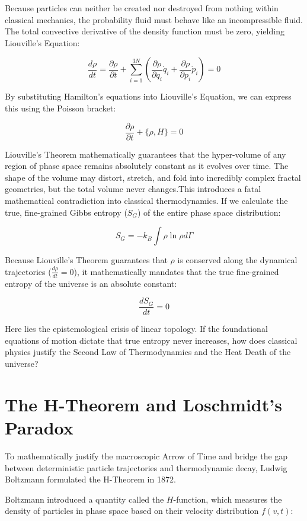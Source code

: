\documentclass[12pt,openany]{book}
\theoremstyle{plain}
\theoremstyle{definition}
\theoremstyle{remark}
\begin{document}
Because particles can neither be created nor destroyed from nothing within classical mechanics, the probability fluid must behave like an incompressible fluid. The total convective derivative of the density function must be zero, yielding Liouville's Equation:

$$\frac{d\rho}{dt}=\frac{\partial\rho}{\partial t}+\sum_{i=1}^{3N}\left(\frac{\partial\rho}{\partial q_i}\dot{q}_i+\frac{\partial\rho}{\partial p_i}\dot{p}_i\right)=0$$

By substituting Hamilton's equations into Liouville's Equation, we can express this using the Poisson bracket:

$$\frac{\partial\rho}{\partial t}+\{\rho,H\}=0$$

Liouville's Theorem mathematically guarantees that the hyper-volume of any region of phase space remains absolutely constant as it evolves over time. The shape of the volume may distort, stretch, and fold into incredibly complex fractal geometries, but the total volume never changes.This introduces a fatal mathematical contradiction into classical thermodynamics. If we calculate the true, fine-grained Gibbs entropy ($S_G$) of the entire phase space distribution:

$$S_G=-k_B\int\rho\ln\rho d\Gamma$$

Because Liouville's Theorem guarantees that $\rho$ is conserved along the dynamical trajectories ($\frac{d\rho}{dt}=0$), it mathematically mandates that the true fine-grained entropy of the universe is an absolute constant:

$$\frac{dS_G}{dt}=0$$

Here lies the epistemological crisis of linear topology. If the foundational equations of motion dictate that true entropy never increases, how does classical physics justify the Second Law of Thermodynamics and the Heat Death of the universe?

\section{The H-Theorem and Loschmidt's Paradox}

To mathematically justify the macroscopic Arrow of Time and bridge the gap between deterministic particle trajectories and thermodynamic decay, Ludwig Boltzmann formulated the H-Theorem in 1872. 

Boltzmann introduced a quantity called the $H$-function, which measures the density of particles in phase space based on their velocity distribution $f(v, t)$:
\end{document}
